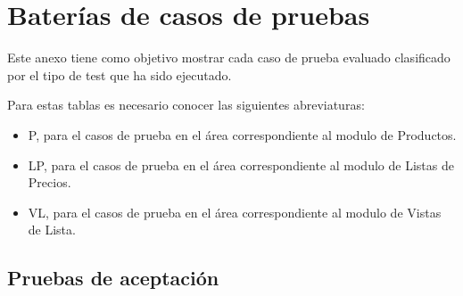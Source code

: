 \chapter{Baterías de casos de pruebas}
Este anexo tiene como objetivo mostrar cada caso de prueba evaluado clasificado
por el tipo de test que ha sido ejecutado.

Para estas tablas es necesario conocer las siguientes abreviaturas:

\begin{itemize}
\item P, para el casos de prueba en el área correspondiente al modulo de Productos.
\item LP, para el casos de prueba en el área correspondiente al modulo de Listas de Precios.
\item VL, para el casos de prueba en el área correspondiente al modulo de Vistas de Lista.
\end{itemize}

\section{Pruebas de aceptación}

